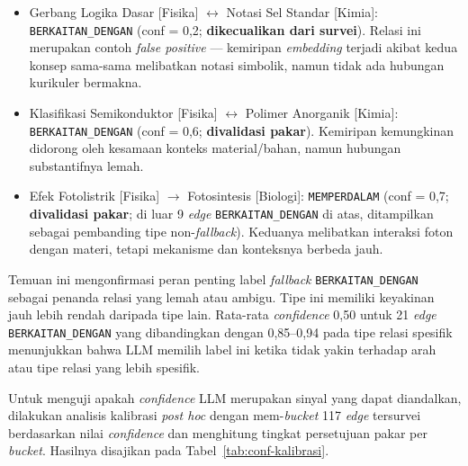 \documentclass[main]{subfiles}
\begin{document}
\begin{itemize}
  \item Gerbang Logika Dasar [Fisika] $\leftrightarrow$ Notasi Sel Standar [Kimia]:
    \texttt{BERKAITAN\_DENGAN} (conf = 0{,}2; \textbf{dikecualikan dari survei}).
    Relasi ini merupakan contoh \textit{false positive} --- kemiripan
    \textit{embedding} terjadi akibat kedua konsep sama-sama melibatkan
    notasi simbolik, namun tidak ada hubungan kurikuler bermakna.
  \item Klasifikasi Semikonduktor [Fisika] $\leftrightarrow$ Polimer Anorganik [Kimia]:
    \texttt{BERKAITAN\_DENGAN} (conf = 0{,}6; \textbf{divalidasi pakar}).
    Kemiripan kemungkinan didorong oleh kesamaan konteks material/bahan,
    namun hubungan substantifnya lemah.
  \item Efek Fotolistrik [Fisika] $\to$ Fotosintesis [Biologi]:
    \texttt{MEMPERDALAM} (conf = 0{,}7; \textbf{divalidasi pakar}; di luar 9
    \textit{edge} \texttt{BERKAITAN\_DENGAN} di atas, ditampilkan sebagai
    pembanding tipe non-\textit{fallback}). Keduanya melibatkan interaksi
    foton dengan materi, tetapi mekanisme dan konteksnya berbeda jauh.
\end{itemize}

Temuan ini mengonfirmasi peran penting label \textit{fallback} \texttt{BERKAITAN\_DENGAN}
sebagai penanda relasi yang lemah atau ambigu. Tipe ini memiliki keyakinan jauh
lebih rendah daripada tipe lain. Rata-rata \textit{confidence} 0{,}50 untuk 21
\textit{edge} \texttt{BERKAITAN\_DENGAN} yang dibandingkan dengan 0{,}85--0{,}94 pada tipe relasi
spesifik menunjukkan bahwa LLM memilih label ini ketika tidak yakin terhadap
arah atau tipe relasi yang lebih spesifik.

Untuk menguji apakah \textit{confidence} LLM merupakan sinyal yang
dapat diandalkan, dilakukan analisis kalibrasi \textit{post hoc}
dengan mem-\textit{bucket} 117 \textit{edge} tersurvei berdasarkan
nilai \textit{confidence} dan menghitung tingkat persetujuan pakar
per \textit{bucket}. Hasilnya disajikan pada
Tabel~\ref{tab:conf-kalibrasi}.
\end{document}
